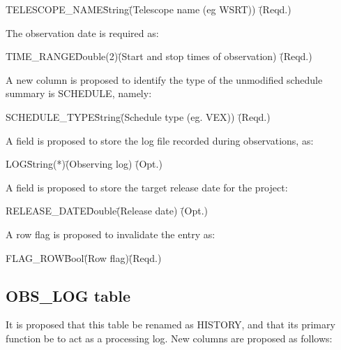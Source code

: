 \documentclass{article}
\begin{document}
\begin{tabbing} 
TELESCOPE\_NAME\quad\quad \= String\quad\quad \= (Telescope name (eg WSRT))
 \quad\quad \= (Reqd.) \\
\end{tabbing}

The observation date is required as:

\begin{tabbing} 
TIME\_RANGE\quad\quad \= Double(2)\quad\quad \= 
(Start and stop times of observation)
 \quad\quad \= (Reqd.) \\
\end{tabbing}

A new column is proposed to identify the type of the unmodified
schedule summary is SCHEDULE, namely:

\begin{tabbing} 
SCHEDULE\_TYPE\quad\quad \= String\quad\quad \= 
(Schedule type (eg. VEX)) \quad\quad \= (Reqd.) \\
\end{tabbing}

A field is proposed to store the log file recorded during observations, as:

\begin{tabbing}
LOG\quad\quad \= String(*)\quad\quad \= (Observing log)
 \quad\quad \= (Opt.) \\
\end{tabbing}

A field is proposed to store the target release date for the project:

\begin{tabbing}
RELEASE\_DATE\quad\quad \= Double\quad\quad \= (Release date)
 \quad\quad \= (Opt.) \\
\end{tabbing}

A row flag is proposed to invalidate the entry as:

\begin{tabbing}
FLAG\_ROW\quad\quad \= Bool\quad\quad \= (Row flag)\quad\quad \= (Reqd.)\\
\end{tabbing}

\subsection{OBS\_LOG table}

It is proposed that this table be renamed as HISTORY, and that its
primary function be to act as a processing log. New columns
are proposed as follows:
\end{document}
